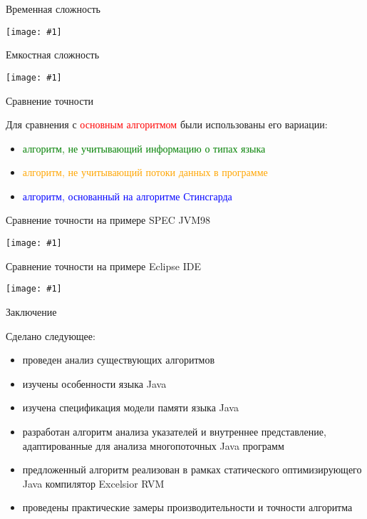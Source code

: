 \documentclass[usenames,dvipsnames,pdftex,unicode]{beamer}
\newcommand{\inputplot}[1]{\centering\texttt{[image: \#1]}}
\begin{document}
\begin{frame}{Временная сложность}

  \inputplot{simple_ops}

\end{frame}

\begin{frame}{Емкостная сложность}

  \inputplot{mem_used}

\end{frame}

\begin{frame}{Сравнение точности}

  Для сравнения с \textcolor{Red}{основным алгоритмом} были использованы его
  вариации:
  \begin{itemize}
    \item \textcolor{Green}{алгоритм, не учитывающий информацию о типах языка}
    \item \textcolor{Orange}{алгоритм, не учитывающий потоки данных в программе}
    \item \textcolor{Blue}{алгоритм, основанный на алгоритме Стинсгарда}
  \end{itemize}

\end{frame}

\begin{frame}{Сравнение точности на примере SPEC JVM98}

  \inputplot{specjvm_all_aliases_distribution_cumulative}

\end{frame}

\begin{frame}{Сравнение точности на примере Eclipse IDE}

  \inputplot{eclipse_all_aliases_distribution_cumulative}

\end{frame}

\begin{frame}{Заключение}

  Сделано следующее:
  \begin{itemize}
    \item проведен анализ существующих алгоритмов
    \item изучены особенности языка Java
    \item изучена спецификация модели памяти языка Java
    \item разработан алгоритм анализа указателей и внутреннее представление,
          адаптированные для анализа многопоточных Java программ
    \item предложенный алгоритм реализован в рамках статического
          оптимизирующего Java компилятор Excelsior RVM
    \item проведены практические замеры производительности и точности алгоритма
  \end{itemize}

\end{frame}
\end{document}
